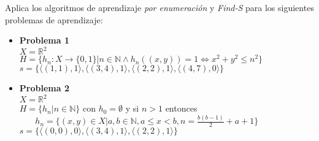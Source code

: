 \documentclass{mulcia_aa}
\begin{document}
\begin{problem}
Aplica los algoritmos de aprendizaje \emph{por enumeración} y  \emph{Find-S} para los siguientes problemas de aprendizaje:
\end{problem}
\vspace{-5pt}
\begin{solution}

\begin{itemize}
    \item \textbf{Problema 1} \\
    $X = \mathbb{R}^2$ \\
    $H = \{h_n:X\to \{0,1\}|n\in\mathbb{N}\wedge h_n((x,y))=1\Leftrightarrow x^2+y^2 \le n^2 \}$ \\
    $s = \{\langle (1, 1),1\rangle,\langle (3, 4),1\rangle,\langle (2, 2),1\rangle,\langle (4, 7),0\rangle\}$\\
    
    \item \textbf{Problema 2} \\
    $X = \mathbb{R}^2$ \\
    $H = \{h_n|n\in \mathbb{N}\}$ con $h_0=\emptyset$ y si $n >1$ entonces \\
    \textcolor{white}{.}$\ \ \ \ \ \ \ h_n=\{(x,y)\in X|a,b\in\mathbb{N}, a\le x < b, n = \frac{b(b-1)}{2}+a+1\}$\\
    $s = \{\langle (0, 0),0\rangle,\langle (3, 4),1\rangle,\langle (2, 2),1\rangle\}$\\
\end{itemize}
\end{solution}
\end{document}
